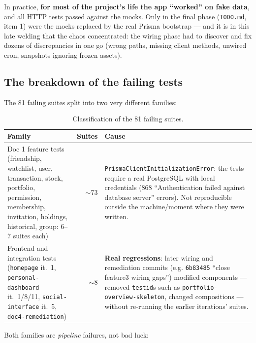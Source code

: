 \documentclass[11pt,a4paper]{article}
\newcommand{\fail}[1]{\textcolor{failred}{\textbf{#1}}}
\newcommand{\file}[1]{\texttt{\small #1}}
\begin{document}
In practice, \textbf{for most of the project's life the app ``worked'' on fake data}, and all HTTP tests passed against the mocks. Only in the final phase (\file{TODO.md}, item 1) were the mocks replaced by the real Prisma bootstrap --- and it is in this late welding that the chaos concentrated: the wiring phase had to discover and fix dozens of discrepancies in one go (wrong paths, missing client methods, unwired cron, snapshots ignoring frozen assets).

\subsection{The breakdown of the failing tests}
\label{sec:test-breakdown}

The 81 failing suites split into two very different families:

\begin{table}[h!]
\centering
\small
\begin{tabular}{p{6.2cm}rp{6.2cm}}
\toprule
\textbf{Family} & \textbf{Suites} & \textbf{Cause} \\
\midrule
Doc 1 feature tests (friendship, watchlist, user, transaction, stock, portfolio, permission, membership, invitation, holdings, historical, group: 6--7 suites each) & $\sim$73 & \file{PrismaClientInitializationError}: the tests require a real PostgreSQL with local credentials (868 ``Authentication failed against database server'' errors). Not reproducible outside the machine/moment where they were written. \\
\addlinespace
Frontend and integration tests (\file{homepage} it.~1, \file{personal-dashboard} it.~1/8/11, \file{social-interface} it.~5, \file{doc4-remediation}) & $\sim$8 & \fail{Real regressions}: later wiring and remediation commits (e.g. \file{6b83485} ``close feature3 wiring gaps'') modified components --- removed \file{testid}s such as \file{portfolio-overview-skeleton}, changed compositions --- without re-running the earlier iterations' suites. \\
\bottomrule
\end{tabular}
\caption{Classification of the 81 failing suites.}
\end{table}

Both families are \emph{pipeline} failures, not bad luck:
\end{document}
